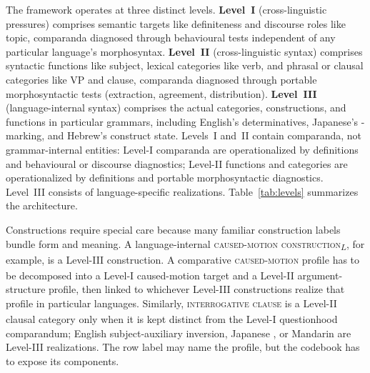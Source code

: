 \documentclass[12pt]{article}
\begin{document}
The framework operates at three distinct levels. \textbf{Level~I} (cross-linguistic pressures) comprises semantic targets like definiteness and discourse roles like topic, comparanda diagnosed through behavioural tests independent of any particular language's morphosyntax. \textbf{Level~II} (cross-linguistic syntax) comprises syntactic functions like subject, lexical categories like verb, and phrasal or clausal categories like VP and clause, comparanda diagnosed through portable morphosyntactic tests (extraction, agreement, distribution). \textbf{Level~III} (language-internal syntax) comprises the actual categories, constructions, and functions in particular grammars, including English's determinatives, Japanese's -marking, and Hebrew's construct state. Levels~I and~II contain comparanda, not grammar-internal entities: Level-I comparanda are operationalized by definitions and behavioural or discourse diagnostics; Level-II functions and categories are operationalized by definitions and portable morphosyntactic diagnostics. Level~III consists of language-specific realizations. Table~\ref{tab:levels} summarizes the architecture.

Constructions require special care because many familiar construction labels bundle form and meaning. A language-internal \textsc{caused-motion construction}\textsubscript{$L$}, for example, is a Level-III construction. A comparative \textsc{caused-motion}\textsubscript{\Cross} profile has to be decomposed into a Level-I caused-motion target and a Level-II argument-structure profile, then linked to whichever Level-III constructions realize that profile in particular languages. Similarly, \textsc{interrogative clause}\textsubscript{\Cross} is a Level-II clausal category only when it is kept distinct from the Level-I questionhood comparandum; English subject-auxiliary inversion, Japanese , or Mandarin  are Level-III realizations. The row label may name the profile, but the codebook has to expose its components.
\end{document}
